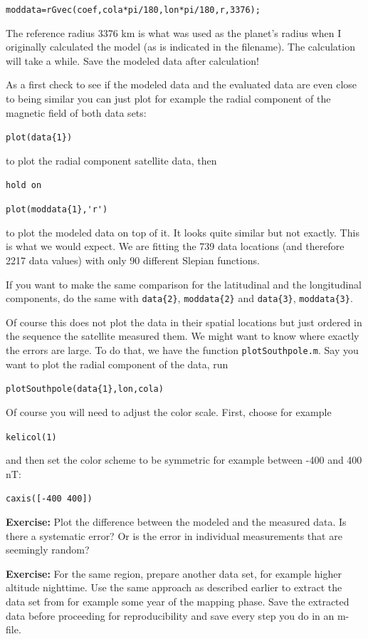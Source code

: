 \documentclass[11pt]{article}
\begin{document}
\qquad \verb+moddata=rGvec(coef,cola*pi/180,lon*pi/180,r,3376);+

The reference radius 3376 km is what was used as the planet's radius when I originally calculated the model (as is indicated in the filename). The calculation will take a while. Save the modeled data after calculation!

As a first check to see if the modeled data and the evaluated data are even close to being similar you can just plot for example the radial component of the magnetic field of both data sets:

\qquad \verb+plot(data{1})+

to plot the radial component satellite data, then

\qquad \verb+hold on+

\qquad \verb+plot(moddata{1},'r')+

to plot the modeled data on top of it. It looks quite similar but not exactly. This is what we would expect. We are fitting the 739 data locations (and therefore 2217 data values) with only 90 different Slepian functions. 

If you want to make the same comparison for the latitudinal and the longitudinal components, do the same with \verb+data{2}+, \verb+moddata{2}+ and  \verb+data{3}+, \verb+moddata{3}+.

Of course this does not plot the data in their spatial locations but just ordered in the sequence the satellite measured them. We might want to know where exactly the errors are large. To do that, we have the function \verb+plotSouthpole.m+. Say you want to plot the radial component of the data, run 

\qquad \verb+plotSouthpole(data{1},lon,cola)+

Of course you will need to adjust the color scale. First, choose for example

\qquad \verb+kelicol(1)+ 

and then set the color scheme to be symmetric for example between -400 and 400 nT:

\qquad \verb+caxis([-400 400])+


\textbf{Exercise:} Plot the difference between the modeled and the measured data. Is there a systematic error? Or is the error in individual measurements that are seemingly random?

\textbf{Exercise:} For the same region, prepare another data set, for example higher altitude nighttime. Use the same approach as described earlier to extract the data set from for example some year of the mapping phase. Save the extracted data before proceeding for reproducibility and save every step you do in an m-file.
\end{document}
